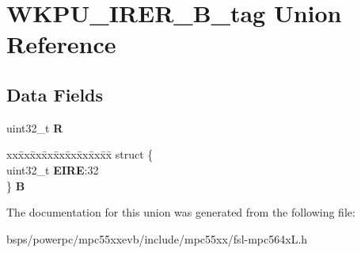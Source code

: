 \hypertarget{unionWKPU__IRER__32B__tag}{}\section{W\+K\+P\+U\+\_\+\+I\+R\+E\+R\+\_\+B\+\_\+tag Union Reference}
\label{unionWKPU__IRER__32B__tag}
\subsection*{Data Fields}
\begin{DoxyCompactItemize}
\item 
\mbox{\label{unionWKPU__IRER__32B__tag_a1a75099582d59195e73187abd3c918f3}} 
uint32\+\_\+t {\bfseries R}
\item 
\mbox{\label{unionWKPU__IRER__32B__tag_ae319e1a8ed44856cf2ef8dc9af9cfdc7}} 
\begin{tabbing}
xx\=xx\=xx\=xx\=xx\=xx\=xx\=xx\=xx\=\kill
struct \{\\
\>uint32\_t {\bfseries EIRE}:32\\
\} {\bfseries B}\\

\end{tabbing}\end{DoxyCompactItemize}


The documentation for this union was generated from the following file\+:\begin{DoxyCompactItemize}
\item 
bsps/powerpc/mpc55xxevb/include/mpc55xx/fsl-\/mpc564x\+L.\+h\end{DoxyCompactItemize}
